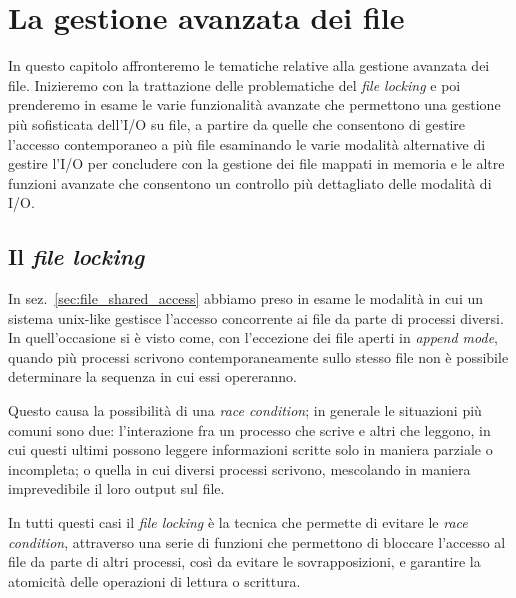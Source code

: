 \chapter{La gestione avanzata dei file}
\label{cha:file_advanced}

In questo capitolo affronteremo le tematiche relative alla gestione avanzata
dei file. Inizieremo con la trattazione delle problematiche del \textit{file
  locking} e poi prenderemo in esame le varie funzionalità avanzate che
permettono una gestione più sofisticata dell'I/O su file, a partire da quelle
che consentono di gestire l'accesso contemporaneo a più file esaminando le
varie modalità alternative di gestire l'I/O per concludere con la gestione dei
file mappati in memoria e le altre funzioni avanzate che consentono un
controllo più dettagliato delle modalità di I/O.


\section{Il \textit{file locking}}
\label{sec:file_locking}


In sez.~\ref{sec:file_shared_access} abbiamo preso in esame le modalità in cui
un sistema unix-like gestisce l'accesso concorrente ai file da parte di
processi diversi. In quell'occasione si è visto come, con l'eccezione dei file
aperti in \textit{append mode}, quando più processi scrivono
contemporaneamente sullo stesso file non è possibile determinare la sequenza
in cui essi opereranno.

Questo causa la possibilità di una \textit{race condition}; in generale le
situazioni più comuni sono due: l'interazione fra un processo che scrive e
altri che leggono, in cui questi ultimi possono leggere informazioni scritte
solo in maniera parziale o incompleta; o quella in cui diversi processi
scrivono, mescolando in maniera imprevedibile il loro output sul file.

In tutti questi casi il \textit{file locking} è la tecnica che permette di
evitare le \textit{race condition}, attraverso una serie di funzioni che
permettono di bloccare l'accesso al file da parte di altri processi, così da
evitare le sovrapposizioni, e garantire la atomicità delle operazioni di
lettura o scrittura.


